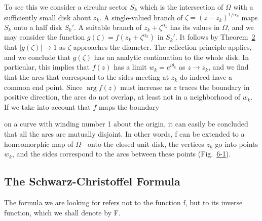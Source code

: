 To see this we consider a circular sector $S_{k}$ which is the intersection of $\Omega$ with a sufficiently small disk about $z_{k}$. A single-valued branch of $\zeta = (z - z_k)^{1 / \alpha_k}$ maps $S_{k}$ onto a half disk $S_{k}'$. A suitable branch of $z_{k} + \zeta^{\alpha_{k}}$ has its values in $\Omega$, and we may consider the function $g(\zeta) = f(z_{k} + \zeta^{\alpha_{k}})$ in $S_{k}'$. It follows by Theorem~\hyperref[thm:6.2]{2} that $|g(\zeta)| \to 1$ as $\zeta$ approaches the diameter. The reflection principle applies, and we conclude that $g(\zeta)$ has an analytic continuation to the whole disk. In particular, this implies that $f(z)$ has a limit $w_{k} = e^{i\theta_{k}}$ as $z \to z_{k}$, and we find that the arcs that correspond to the sides meeting at $z_{k}$ do indeed have a common end point. Since $\arg f(z)$ must increase as $z$ traces the boundary in positive direction, the arcs do not overlap, at least not in a neighborhood of $w_{k}$. If we take into account that $f$ maps the boundary


on a curve with winding number 1 about the origin, it can easily be concluded that all the arcs are mutually disjoint. In other words, f can be extended to a homeomorphic map of $\Omega^{-}$ onto the closed unit disk, the vertices $z_{k}$ go into points $w_{k}$, and the sides correspond to the arcs between these points (Fig.~\hyperref[fig:6-1]{6-1}).

\setcounter{section}{2}\setcounter{subsection}{1}\subsection{The Schwarz-Christoffel Formula}\label{sec:6.2.2}
The formula we are looking for refers not to the function f, but to its inverse function, which we shall denote by F.


